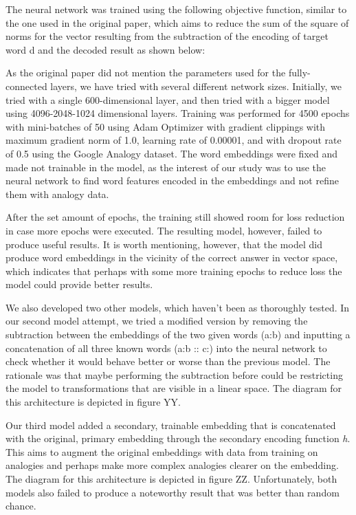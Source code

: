 \documentclass[11pt]{article}
\begin{document}
The neural network was trained using the following objective function,
similar to the one used in the original paper, which aims to reduce the
sum of the square of norms for the vector resulting from the subtraction
of the encoding of target word d and the decoded result as shown below:


As the original paper did not mention the parameters used for the
fully-connected layers, we have tried with several different network
sizes. Initially, we tried with a single 600-dimensional layer, and then
tried with a bigger model using 4096-2048-1024 dimensional layers.
Training was performed for 4500 epochs with mini-batches of 50 using
Adam Optimizer with gradient clippings with maximum gradient norm of
1.0, learning rate of 0.00001, and with dropout rate of 0.5 using the
Google Analogy dataset. The word embeddings were fixed and made not
trainable in the model, as the interest of our study was to use the
neural network to find word features encoded in the embeddings and not
refine them with analogy data.

After the set amount of epochs, the training still showed room for loss
reduction in case more epochs were executed. The resulting model,
however, failed to produce useful results. It is worth mentioning,
however, that the model did produce word embeddings in the vicinity of
the correct answer in vector space, which indicates that perhaps with some more training epochs to
reduce loss the model could provide better results.

We also developed two other models, which haven't been as thoroughly
tested. In our second model attempt, we tried a modified version by
removing the subtraction between the embeddings of the two given words
(a:b) and inputting a concatenation of all three known words (a:b :: c:)
into the neural network to check whether it would behave better or worse
than the previous model. The rationale was that maybe performing the
subtraction before could be restricting the model to transformations
that are visible in a linear space. The diagram for this architecture is
depicted in figure YY.

Our third model added a secondary, trainable embedding that is
concatenated with the original, primary embedding through the secondary
encoding function \emph{h}. This aims to augment the original embeddings
with data from training on analogies and perhaps make more complex
analogies clearer on the embedding. The diagram for this architecture is
depicted in figure ZZ. Unfortunately, both models also failed to produce
a noteworthy result that was better than random chance.
\end{document}
